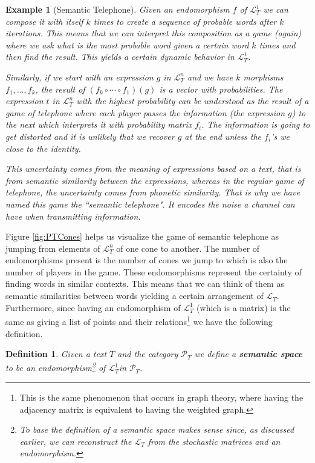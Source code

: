 \documentclass[10pt,a4paper]{elsarticle}
\renewcommand{\L}{\mathcal{L}}
\renewcommand{\P}{\mathcal{P}}
\newtheorem{exa}[theorem]{Example}
\newtheorem{definition}[theorem]{Definition}
\begin{document}
\begin{exa}[Semantic Telephone]\label{exa:st}
	Given an endomorphism $f$ of $\L_{T}^{1}$ we can compose it with itself $k$ times to create a sequence of probable words after $k$ iterations. This means that we can interpret this composition as a game (again) where we ask what is the most probable word given a certain word $k$ times and then find the result. This yields a certain dynamic behavior in $\L_{T}^{1}$.
	
	Similarly, if we start with an expression $g$ in $\L_{T}^{n}$ and we have $k$ morphisms $f_{1},\dots, f_{k}$, the result of $(f_k\circ\cdots\circ f_1)(g)$ is a vector with probabilities. The expression $t$ in $\L_{T}^{n}$ with the highest probability can be understood as the result of a game of telephone where each player passes the information (the expression $g$) to the next which interprets it with probability matrix $f_i$. The information is going to get distorted and it is unlikely that we recover $g$ at the end unless the $f_i$'s we close to the identity.
	
	This uncertainty comes from the meaning of expressions based on a text, that is from semantic similarity between the expressions, whereas in the regular game of telephone, the uncertainty comes from phonetic similarity. That is why we have named this game the ``semantic telephone". It encodes the noise a channel can have when transmitting information.
\end{exa}

Figure \ref{fig:PTCones} helps us visualize the game of semantic telephone as jumping from elements of $\L_{T}^{n}$ of one cone to another. The number of endomorphisms present is the number of cones we jump to which is also the number of players in the game. These endomorphisms represent the certainty of finding words in similar contexts. This means that we can think of them as semantic similarities between words yielding a certain arrangement of $\L_{T}$. Furthermore, since having an endomorphism of $\L_{T}^{1}$ (which is a matrix) is the same as giving a list of points and their relations\footnote{This is the same phenomenon that occurs in graph theory, where having the adjacency matrix is equivalent to having the weighted graph.} we have the following definition.

\begin{definition}
	Given a text $T$ and the category $\P_{T}$ we define a \textbf{semantic space} to be an endomorphism\footnote{To base the definition of a semantic space makes sense since, as discussed earlier, we can reconstruct the $\L_{T}$ from the stochastic matrices and an endomorphism.}  of $\L_{T}^{1}$in $\P_{T}$.
	
\end{definition}
\end{document}
